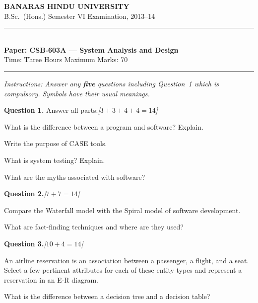 \documentclass[11pt,a4paper]{article}
\newcommand{\pts}[1]{\hfill   \textit{[#1]}}
\begin{document}
\begin{center}
  {\large\bfseries BANARAS HINDU UNIVERSITY}\\[2pt]
  {\normalsize B.Sc.\ (Hons.) Semester VI Examination, 2013--14}\\[6pt]
  \rule{0.8\linewidth}{0.5pt}\\[6pt]
  {\large\bfseries Paper: CSB-603A --- System Analysis and Design}\\[4pt]
  {\normalsize Time: Three Hours \hfill Maximum Marks: 70}
\end{center}

\rule{\linewidth}{0.4pt}

\smallskip



\noindent   \textit{Instructions: Answer any   \textbf{five} questions including Question~1 which is compulsory. Symbols have their usual meanings.}

\bigskip




\noindent   \textbf{Question 1.} Answer all parts:\pts{$3+3+4+4=14$}

\begin{parts}
  \item What is the difference between a program and software? Explain.
  \item Write the purpose of CASE tools.
  \item What is system testing? Explain.
  \item What are the myths associated with software?
\end{parts}

\bigskip




\noindent   \textbf{Question 2.}\pts{$7+7=14$}

\begin{parts}
  \item Compare the Waterfall model with the Spiral model of software development.
  \item What are fact-finding techniques and where are they used?
\end{parts}

\bigskip




\noindent   \textbf{Question 3.}\pts{$10+4=14$}

\begin{parts}
  \item An airline reservation is an association between a passenger, a flight, and a seat. Select a few pertinent attributes for each of these entity types and represent a reservation in an E-R diagram.
  \item What is the difference between a decision tree and a decision table?
\end{parts}
\end{document}
